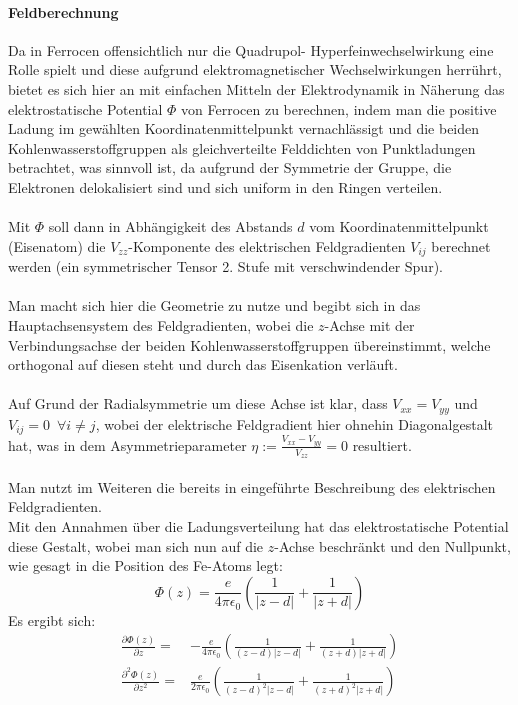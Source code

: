 \documentclass[german,  %
parskip=full,  %
headsepline]{scrartcl}
\newcommand{\bcref}[1]{\namecref{#1} \textcolor{blue}{\labelcref{#1}}}
\begin{document}
\paragraph{Feldberechnung}
Da in Ferrocen offensichtlich nur die Quadrupol- Hyperfeinwechselwirkung eine Rolle spielt und diese aufgrund elektromagnetischer Wechselwirkungen herrührt, bietet es sich hier an mit einfachen Mitteln der Elektrodynamik in Näherung das elektrostatische Potential $\Phi$ von Ferrocen zu berechnen, indem man die positive Ladung im gewählten Koordinatenmittelpunkt vernachlässigt und die beiden Kohlenwasserstoffgruppen als gleichverteilte Felddichten von Punktladungen betrachtet, was sinnvoll ist, da aufgrund der Symmetrie der Gruppe, die Elektronen delokalisiert sind und sich uniform in den Ringen verteilen.\\\\
Mit $\Phi$ soll dann in Abhängigkeit des Abstands $d$ vom Koordinatenmittelpunkt (Eisenatom) die $V_{zz}$-Komponente des elektrischen  Feldgradienten $V_{ij}$ berechnet werden (ein symmetrischer Tensor 2. Stufe mit verschwindender Spur).\\\\
Man macht sich hier die Geometrie zu nutze und begibt sich in das Hauptachsensystem des Feldgradienten, wobei die $z$-Achse mit der Verbindungsachse der beiden Kohlenwasserstoffgruppen übereinstimmt, welche orthogonal auf diesen steht und durch das Eisenkation verläuft. \\\\
Auf Grund der Radialsymmetrie um diese Achse ist klar, dass $V_{xx} = V_{yy}$ und $V_{ij}=0 \,\,\, \forall i \ne j $, wobei der elektrische Feldgradient hier ohnehin Diagonalgestalt hat, was in dem Asymmetrieparameter $\eta := \frac{V_{xx}-V_{yy}}{V_{zz}} = 0$ resultiert.\\\\
Man nutzt im Weiteren die bereits in \bcref{quad} eingeführte Beschreibung des elektrischen Feldgradienten.\\
Mit den Annahmen über die Ladungsverteilung hat das elektrostatische Potential diese Gestalt, wobei man sich nun auf die $z$-Achse beschränkt und den Nullpunkt, wie gesagt in die Position des Fe-Atoms legt:
\begin{equation}
    \Phi(z) = \frac{e}{4 \pi \epsilon_0}\left (\frac{1}{|z-d|} + \frac{1}{|z+d|} \right)
\end{equation}
Es ergibt sich:
\begin{align}
    \frac{\partial \Phi(z)}{\partial z} = & -\frac{e}{4 \pi \epsilon_0}\left (\frac{1}{(z-d)|z-d|} + \frac{1}{(z+d)|z+d|} \right)\\
    \frac{\partial^2 \Phi(z)}{\partial z^2} =& \frac{e}{2 \pi \epsilon_0}\left (\frac{1}{(z-d)^2|z-d|} + \frac{1}{(z+d)^2|z+d|} \right)
\end{align}
\end{document}
